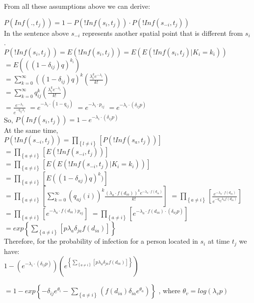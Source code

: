 \documentclass[12pt]{article}
\newcommand \mbreak {\\ \vspace{0.1in}}
\begin{document}
From all these assumptions above we can derive:


\begin{center}

    $P(Inf(.,t_j)) = 1 - P(!Inf(s_i, t_j)) \cdot  P(!Inf(s_{-i }, t_j))$ \mbreak
   In the sentence above { $ s_{-i } $ } represents another spatial point that is different from $s_{i } $. \mbreak
    $P(!Inf(s_i, t_j)) = E(!Inf(s_i, t_j)) = E(E(!Inf(s_i, t_j)|K_i=k_i))$  \mbreak
    $\displaystyle =E(((1-\delta_{ij})q)^{k_i})$  \mbreak
    $\displaystyle = \sum_{k=0}^{\infty} ((1-\delta_{ij})q)^k(\frac{\lambda_i^ke^{-\lambda_i}}{k!})$\mbreak
    $\displaystyle =  \sum_{k=0}^{\infty} q_{ij}^k (\frac{\lambda_i^ke^{-\lambda_i}}{k!})$\mbreak
    $\displaystyle = \frac{e^{-\lambda_i}}{e^{-q_{ij}\lambda_i}}$
    $ = e^{-\lambda_i\cdot(1-q_{ij})} $
    $ = e^{-\lambda_i \cdot p_{ij}} $
    $ = e^{-\lambda_i \cdot (\delta_{ij}p)}$ \mbreak
    So,  $P(Inf(s_i, t_j)) = 1 - e^{-\lambda_i \cdot (\delta_{ij}p)} $ \mbreak
    At the same time,\mbreak
    $\displaystyle P(!Inf(s_{-i}, t_j)) = \prod_{\left\{l \ne i\right\}}\left[P(!Inf(s_a, t_j)) \right]$ \mbreak
    $\displaystyle = \prod_{\left\{ a \ne i \right\}}\left[E(!Inf(s_{-i}, t_j))\right] $
    $\displaystyle = \prod_{\left\{ a \ne i \right\}}\left[E(E(!Inf(s_{-i}, t_j)|K_i=k_i)) \right]$  \mbreak
    $\displaystyle = \prod_{\left\{ a \ne i \right\}}\left[ E((1-\delta_{aj})q)^k )  \right]$\mbreak
    $\displaystyle = \prod_{\left\{ a \ne i \right\}}\left[ \sum_{k=0}^{\infty}(q_{aj}(i))^k\frac{(\lambda_a\cdot f(d_{ia}))^ke^{-\lambda_a \cdot f(d_{ia})}}{k!}    \right] $
    $\displaystyle = \prod_{\left\{ a \ne i \right\}}\left[ \frac{e^{-\lambda_a \cdot f(d_{ia})}}{e^{-q_{aj}\lambda_a f(d_{ia})}}  \right]$\mbreak
    $\displaystyle = \prod_{\left\{ a \ne i \right\}}\left[ e^{-\lambda_a \cdot f(d_{ia}) p_{aj}}  \right]$
    $\displaystyle = \prod_{\left\{ a \ne i \right\}}\left[ e^{-\lambda_a\cdot f(d_{ia}) \cdot (\delta_{aj}p) }  \right]$\mbreak
    $\displaystyle = exp\left\{\sum_{\left\{ a \ne i \right\}}\left[p\lambda_a\delta_{ja}f(d_{ia})   \right] \right\}$ \mbreak
    Therefore, for the probability of infection for a person located in $s_i$ at time $t_j$ we have: \mbreak
    $\displaystyle 1-\left(e^{-\lambda_i \cdot (\delta_{ij}p)}\right) \left(
        e^{\left\{\sum_{\left\{ a \ne i \right\}}\left[p\lambda_a\delta_{ja}f(d_{ia})   \right] \right\}}\right)
     $ \mbreak

    $\displaystyle = 1- exp\left\{-\delta_{ij}e^{\theta_{i}} - \sum_{\left\{ a \ne i  \right\}}
        (f(d_{ia})\delta_{ia}e^{\theta_{a}})   \right\}$
    , where $\theta_{v} = log(\lambda_{v}p)$

\end{center}
\end{document}
